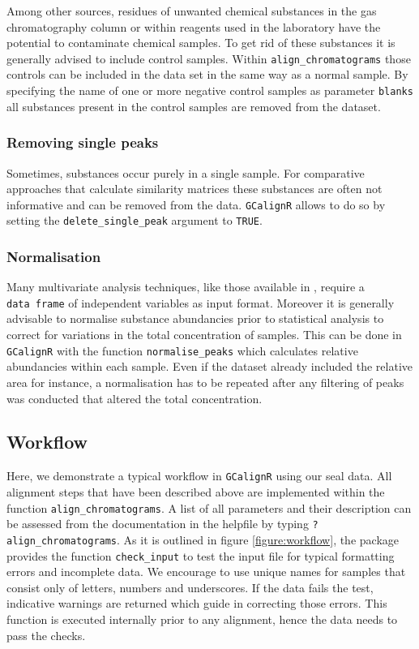 Among other sources, residues of unwanted chemical substances in the gas
chromatography column or within reagents used in the laboratory have the
potential to contaminate chemical samples. To get rid of these
substances it is generally advised to include control samples. Within
\texttt{align\_chromatograms} those controls can be included in the data
set in the same way as a normal sample. By specifying the name of one or
more negative control samples as parameter \texttt{blanks} all
substances present in the control samples are removed from the dataset.

\subsubsection{Removing single peaks}\label{removing-single-peaks}

Sometimes, substances occur purely in a single sample. For comparative
approaches that calculate similarity matrices these substances are often
not informative and can be removed from the data. \texttt{GCalignR}
allows to do so by setting the \texttt{delete\_single\_peak} argument to
\texttt{TRUE}.

\subsubsection{Normalisation}\label{normalisation}

Many multivariate analysis techniques, like those available in
, require a \texttt{data\ frame} of independent variables as
input format. Moreover it is generally advisable to normalise substance
abundancies prior to statistical analysis to correct for variations in
the total concentration of samples. This can be done in
\texttt{GCalignR} with the function \texttt{normalise\_peaks} which
calculates relative abundancies within each sample. Even if the dataset
already included the relative area for instance, a normalisation has to
be repeated after any filtering of peaks was conducted that altered the
total concentration.

\subsection{Workflow}\label{workflow}

Here, we demonstrate a typical workflow in \texttt{GCalignR} using our
seal data. All alignment steps that have been described above are
implemented within the function \texttt{align\_chromatograms}. A list of
all parameters and their description can be assessed from the
documentation in the helpfile by typing \texttt{?align\_chromatograms}.
As it is outlined in figure \ref{figure:workflow}, the package provides
the function \texttt{check\_input} to test the input file for typical
formatting errors and incomplete data. We encourage to use unique names
for samples that consist only of letters, numbers and underscores. If
the data fails the test, indicative warnings are returned which guide in
correcting those errors. This function is executed internally prior to
any alignment, hence the data needs to pass the checks.

